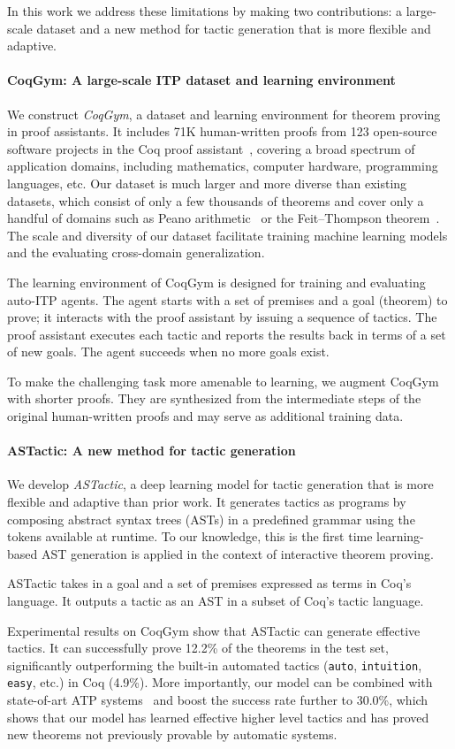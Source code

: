 \documentclass{article}
\newcommand{\smallsec}[1]{\vspace{-3mm} \paragraph{#1}}
\newcommand{\datasetname}{CoqGym}
\newcommand{\numberofprojects}{123 }
\begin{document}
In this work we address these limitations by making two contributions: a large-scale dataset and a new method for tactic generation that is more flexible and adaptive. 


\smallsec{\datasetname: A large-scale ITP dataset and learning environment}
We construct \emph{\datasetname}, a dataset and learning environment for theorem proving in proof assistants. It includes 71K human-written proofs from \numberofprojects open-source software projects in the Coq proof assistant~\citep{barras1997coq}, covering a broad spectrum of application domains, including mathematics, computer hardware, programming languages, etc.
Our dataset is much larger and more diverse than existing datasets, which consist of only a few thousands of theorems and cover only a handful of domains such as Peano arithmetic~\citep{dixon2003isaplanner} or the Feit--Thompson theorem~\citep{gonthier2013machine}. The scale and diversity of our dataset facilitate training machine learning models and the evaluating cross-domain generalization. 


The learning environment of {\datasetname } is designed for training and evaluating auto-ITP agents.
The agent starts with a set of premises and a goal (theorem) to prove; it interacts with the proof assistant by issuing a sequence of tactics. The proof assistant executes each tactic and reports the results back in terms of a set of new goals. The agent succeeds when no more goals exist. 


To make the challenging task more amenable to learning, we augment {\datasetname } with shorter proofs. They are synthesized from the intermediate steps of the original human-written proofs and may serve as additional training data. 




\smallsec{ASTactic: A new method for tactic generation}
We develop \emph{ASTactic}, a deep learning model for tactic generation that is more flexible and adaptive than prior work. It generates tactics as programs by composing abstract syntax trees (ASTs) in a predefined grammar using the tokens available at runtime. To our knowledge, this is the first time learning-based AST generation is applied in the context of interactive theorem proving. 

ASTactic takes in a goal and a set of premises expressed as terms in Coq's language.
It outputs a tactic as an AST in a subset of Coq's tactic language.

Experimental results on {\datasetname } show that ASTactic can generate effective tactics. It can successfully prove 12.2\% of the theorems in the test set, significantly outperforming the built-in automated tactics (\texttt{auto}, \texttt{intuition}, \texttt{easy}, etc.) in Coq (4.9\%). More importantly, our model can be combined with state-of-art ATP systems~\cite{de2008z3,BCD+11, kovacs2013first, schulz2013system} and boost the success rate further to 30.0\%, which shows that our model has learned effective higher level tactics and has proved new theorems not previously provable by automatic systems. 
\end{document}
